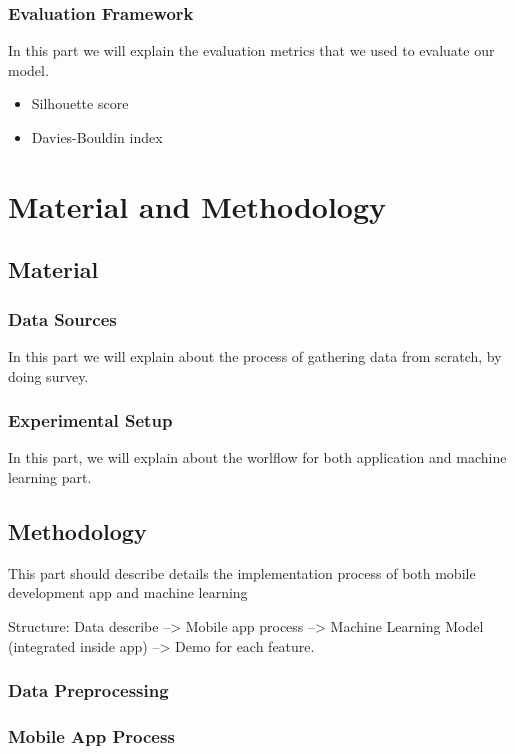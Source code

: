 \documentclass{article}
\begin{document}
\subsubsection{Evaluation Framework}
In this part we will explain the evaluation metrics that we used to evaluate our model.
\begin{itemize}
    \item Silhouette score
    \item Davies-Bouldin index

\end{itemize}

 


\section{Material and Methodology}
\subsection{Material}
\subsubsection{Data Sources}
In this part we will explain about the process of gathering data
from scratch, by doing survey.

\subsubsection{Experimental Setup}
In this part, we will explain about the worlflow for both 
application and machine learning part.

\subsection{Methodology}

This part should describe details the implementation process
of both mobile development app and machine learning

Structure: Data describe --> Mobile app process --> Machine Learning Model (integrated inside app) --> Demo for each feature.

\subsubsection{Data Preprocessing}

\subsubsection{Mobile App Process}
\end{document}
